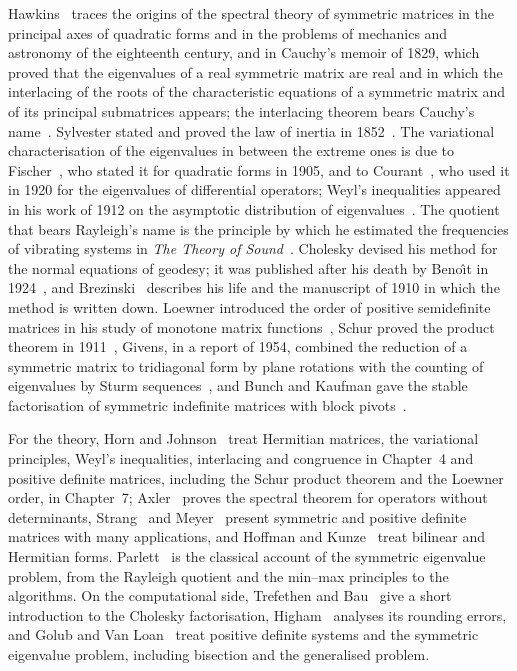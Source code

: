 Hawkins~\cite{hawkins1975cauchy} traces the origins of the spectral theory of symmetric matrices in the principal axes of quadratic forms and in the problems of mechanics and astronomy of the eighteenth century, and in Cauchy's memoir of 1829, which proved that the eigenvalues of a real symmetric matrix are real and in which the interlacing of the roots of the characteristic equations of a symmetric matrix and of its principal submatrices appears; the interlacing theorem bears Cauchy's name~\cite[Sect.~4.3]{horn2013}. Sylvester stated and proved the law of inertia in 1852~\cite{sylvester1852}. The variational characterisation of the eigenvalues in between the extreme ones is due to Fischer~\cite{fischer1905}, who stated it for quadratic forms in 1905, and to Courant~\cite{courant1920}, who used it in 1920 for the eigenvalues of differential operators; Weyl's inequalities appeared in his work of 1912 on the asymptotic distribution of eigenvalues~\cite{weyl1912}. The quotient that bears Rayleigh's name is the principle by which he estimated the frequencies of vibrating systems in \emph{The Theory of Sound}~\cite{rayleigh1877}. Cholesky devised his method for the normal equations of geodesy; it was published after his death by Beno\^{\i}t in 1924~\cite{benoit1924}, and Brezinski~\cite{brezinski2006} describes his life and the manuscript of 1910 in which the method is written down. Loewner introduced the order of positive semidefinite matrices in his study of monotone matrix functions~\cite{loewner1934}, Schur proved the product theorem in 1911~\cite{schur1911}, Givens, in a report of 1954, combined the reduction of a symmetric matrix to tridiagonal form by plane rotations with the counting of eigenvalues by Sturm sequences~\cite{givens1954}, and Bunch and Kaufman gave the stable factorisation of symmetric indefinite matrices with block pivots~\cite{bunchkaufman1977}.

For the theory, Horn and Johnson~\cite{horn2013} treat Hermitian matrices, the variational principles, Weyl's inequalities, interlacing and congruence in Chapter~4 and positive definite matrices, including the Schur product theorem and the Loewner order, in Chapter~7; Axler~\cite[Chap.~7]{axler2024} proves the spectral theorem for operators without determinants, Strang~\cite{strang2016} and Meyer~\cite{meyer2000} present symmetric and positive definite matrices with many applications, and Hoffman and Kunze~\cite{hoffman1971} treat bilinear and Hermitian forms. Parlett~\cite{parlett1998} is the classical account of the symmetric eigenvalue problem, from the Rayleigh quotient and the min--max principles to the algorithms. On the computational side, Trefethen and Bau~\cite[Lecture~23]{trefethen1997} give a short introduction to the Cholesky factorisation, Higham~\cite[Chap.~10]{higham2002accuracy} analyses its rounding errors, and Golub and Van Loan~\cite[Sect.~4.2 and Chap.~8]{golub2013} treat positive definite systems and the symmetric eigenvalue problem, including bisection and the generalised problem.

\chapterreferences

